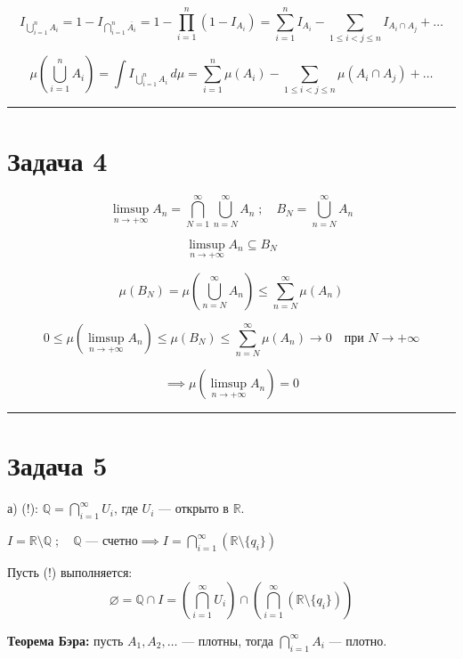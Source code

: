 \documentclass[12pt, a4paper]{article}
\begin{document}
\[
I_{\bigcup\limits_{i=1}^n A_i} = 1 - I_{\bigcap\limits_{i=1}^n \overline{A_i}} = 1 - \prod_{i=1}^n (1 - I_{A_i}) = \sum_{i=1}^n I_{A_i} - \sum_{1 \le i < j \le n} I_{A_i \cap A_j} + \dots
\]

\[
\mu\left(\bigcup_{i=1}^n A_i\right) = \int I_{\bigcup\limits_{i=1}^n A_i} \, d\mu = \sum_{i=1}^n \mu(A_i) - \sum_{1 \le i < j \le n} \mu(A_i \cap A_j) + \dots
\]

\bigskip
\hrule
\bigskip

\section*{Задача 4}

\[
\limsup_{n \to +\infty} A_n = \bigcap_{N=1}^\infty \bigcup_{n=N}^\infty A_n \; ; \quad B_N = \bigcup_{n=N}^\infty A_n
\]

\[
\limsup_{n \to +\infty} A_n \subseteq B_N
\]

\[
\mu(B_N) = \mu\left(\bigcup_{n=N}^\infty A_n\right) \le \sum_{n=N}^\infty \mu(A_n)
\]

\[
0 \le \mu\left(\limsup_{n \to +\infty} A_n\right) \le \mu(B_N) \le \sum_{n=N}^\infty \mu(A_n) \to 0 \quad \text{при } N \to +\infty
\]

\[
\implies \mu\left(\limsup_{n \to +\infty} A_n\right) = 0
\]

\bigskip
\hrule
\bigskip

\section*{Задача 5}

\noindent а) (!): $\mathbb{Q} = \bigcap\limits_{i=1}^\infty U_i$, где $U_i$ --- открыто в $\mathbb{R}$.

\bigskip

\noindent $I = \mathbb{R} \setminus \mathbb{Q} \; ; \quad \mathbb{Q} \text{ --- счетно} \implies I = \bigcap\limits_{i=1}^\infty \left(\mathbb{R} \setminus \{q_i\}\right)$

\noindent Пусть (!) выполняется:
\[
\varnothing = \mathbb{Q} \cap I = \left(\bigcap_{i=1}^\infty U_i\right) \cap \left(\bigcap_{i=1}^\infty (\mathbb{R} \setminus \{q_i\})\right)
\]

\noindent \textbf{Теорема Бэра:} пусть $A_1, A_2, \dots$ --- плотны, тогда $\bigcap\limits_{i=1}^\infty A_i$ --- плотно.

\bigskip
\end{document}
